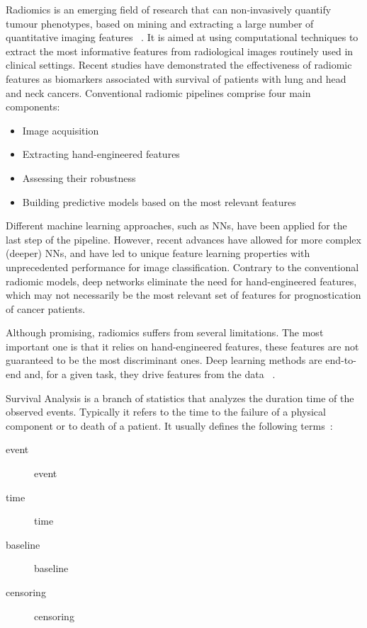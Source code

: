 Radiomics is an emerging field of research that can non-invasively quantify tumour 
phenotypes, based on mining and extracting a large number of quantitative imaging 
features ~\cite{medical:radiomics:data, medical:radiomics:extract-information}.
It is aimed at using computational techniques to extract
the most informative features from radiological images routinely used in clinical settings.
Recent studies have demonstrated the effectiveness of radiomic features as biomarkers 
associated with survival of patients with lung and head and neck cancers. Conventional
radiomic pipelines comprise four main components:
\begin{itemize}
  \item Image acquisition
  \item Extracting hand-engineered features
  \item Assessing their robustness
  \item Building predictive models based on the most relevant features
\end{itemize}

Different machine learning approaches, such as \glspl{NN}, have been applied for the last 
step of the pipeline. However, recent advances have allowed for more complex (deeper) 
\glspl{NN}, and have led to unique feature learning properties with unprecedented performance
for image classification. Contrary to the conventional radiomic models, deep networks
eliminate the need for hand-engineered features, which may not necessarily be the most
relevant set of features for prognostication of cancer patients.

Although promising, radiomics suffers from several 
limitations. The most important one is that it relies on hand-engineered features, 
these features are not guaranteed to be the most discriminant ones. Deep learning methods
are end-to-end and, for a given task, they drive features from the data
~\cite{medical:radiomics-ml-classifiers}.

\label{sec:survival}

Survival Analysis is a branch of statistics that analyzes the duration time of the observed
events. Typically it refers to the time to the failure of a physical component or to death of a
patient. It usually defines the following terms~\cite{neural:survival-analysis}:

\begin{description}
  \item[\Gls{event} ] \glsdesc*{event}
  \item[\Gls{time} ] \glsdesc*{time}
  \item[\Gls{baseline} ] \glsdesc*{baseline}
  \item[\Gls{censoring}] \glsdesc*{censoring}
\end{description}

